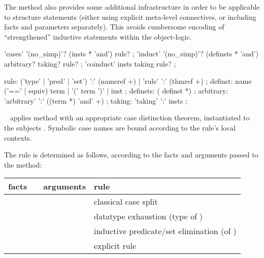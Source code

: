\begin{isabellebody}
\begin{isamarkuptext}
  The \hyperlink{method.induct}{\mbox{}} method also provides some additional
  infrastructure in order to be applicable to structure statements
  (either using explicit meta-level connectives, or including facts
  and parameters separately).  This avoids cumbersome encoding of
  ``strengthened'' inductive statements within the object-logic.

  \begin{rail}
    'cases' '(no_simp)'? (insts * 'and') rule?
    ;
    'induct' '(no_simp)'? (definsts * 'and') \\ arbitrary? taking? rule?
    ;
    'coinduct' insts taking rule?
    ;

    rule: ('type' | 'pred' | 'set') ':' (nameref +) | 'rule' ':' (thmref +)
    ;
    definst: name ('==' | equiv) term | '(' term ')' | inst
    ;
    definsts: ( definst *)
    ;
    arbitrary: 'arbitrary' ':' ((term *) 'and' +)
    ;
    taking: 'taking' ':' insts
    ;
  \end{rail}

  \begin{description}

  \item \hyperlink{method.cases}{\mbox{}}~ applies method \hyperlink{method.rule}{\mbox{}} with an appropriate case distinction theorem, instantiated to
  the subjects .  Symbolic case names are bound according
  to the rule's local contexts.

  The rule is determined as follows, according to the facts and
  arguments passed to the \hyperlink{method.cases}{\mbox{}} method:

  \medskip
  \begin{tabular}{llll}
    facts           &                 & arguments   & rule \\\hline
                    & \hyperlink{method.cases}{\mbox{\isa{cases}}} &             & classical case split \\
                    & \hyperlink{method.cases}{\mbox{\isa{cases}}} & \isa{t}   & datatype exhaustion (type of \isa{t}) \\
    \isa{{\isachardoublequote}{\isasymturnstile}\ A\ t{\isachardoublequote}} & \hyperlink{method.cases}{\mbox{\isa{cases}}} & \isa{{\isachardoublequote}{\isasymdots}{\isachardoublequote}} & inductive predicate/set elimination (of \isa{A}) \\
    \isa{{\isachardoublequote}{\isasymdots}{\isachardoublequote}}     & \hyperlink{method.cases}{\mbox{\isa{cases}}} & \isa{{\isachardoublequote}{\isasymdots}\ rule{\isacharcolon}\ R{\isachardoublequote}} & explicit rule \isa{R} \\
  \end{tabular}
  \medskip


\end{description}
\end{isamarkuptext}
\end{isabellebody}
